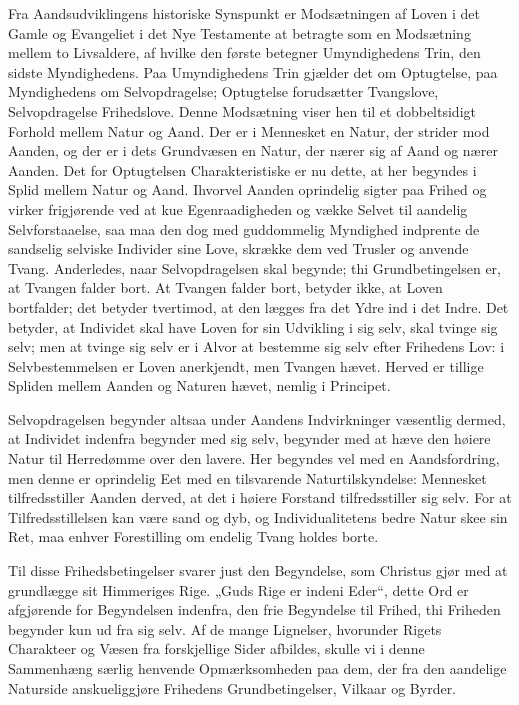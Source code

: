 \documentclass[12pt]{book}
\begin{document}
Fra Aandsudviklingens historiske Synspunkt er Modsætningen af Loven
i det Gamle og Evangeliet i det Nye Testamente at betragte som en
Modsætning mellem to Livsaldere, af hvilke den første betegner
Umyndighedens Trin, den sidste Myndighedens. Paa Umyndighedens
Trin gjælder det om Optugtelse, paa Myndighedens om Selvopdragelse;
Optugtelse forudsætter Tvangslove, Selvopdragelse Frihedslove. Denne
Modsætning viser hen til et dobbeltsidigt Forhold mellem Natur og
Aand. Der er i Mennesket en Natur, der strider mod Aanden, og der er
i dets Grundvæsen en Natur, der nærer sig af Aand og nærer Aanden.
Det for Optugtelsen Charakteristiske er nu dette, at her begyndes i
Splid mellem Natur og Aand. Ihvorvel Aanden oprindelig sigter paa
Frihed og virker frigjørende ved at kue Egenraadigheden og vække
Selvet til aandelig Selvforstaaelse, saa maa den dog med guddommelig
Myndighed indprente de sandselig selviske Individer sine Love,
skrække dem ved Trusler og anvende Tvang. Anderledes, naar
Selvopdragelsen skal begynde; thi Grundbetingelsen er, at Tvangen
falder bort. At Tvangen falder bort, betyder ikke, at Loven
bortfalder; det betyder tvertimod, at den lægges fra det Ydre ind i
det Indre. Det betyder, at Individet skal have Loven for sin
Udvikling i sig selv, skal tvinge sig selv; men at tvinge sig selv
er i Alvor at bestemme sig selv efter Frihedens Lov: i
Selvbestemmelsen er Loven anerkjendt, men Tvangen hævet. Herved er
tillige Spliden mellem Aanden og Naturen hævet, nemlig i Principet.

Selvopdragelsen begynder altsaa under Aandens Indvirkninger
væsentlig dermed, at Individet indenfra begynder med sig selv,
begynder med at hæve den høiere Natur til Herredømme over den
lavere. Her begyndes vel med en Aandsfordring, men denne er
oprindelig Eet med en tilsvarende Naturtilskyndelse: Mennesket
tilfredsstiller Aanden derved, at det i høiere Forstand
tilfredsstiller sig selv. For at Tilfredsstillelsen kan være sand og
dyb, og Individualitetens bedre Natur skee sin Ret, maa enhver
Forestilling om endelig Tvang holdes borte.

Til disse Frihedsbetingelser svarer just den Begyndelse,
som Christus gjør med at grundlægge sit Himmeriges Rige. „Guds Rige
er indeni Eder“, dette Ord er afgjørende for Begyndelsen indenfra,
den frie Begyndelse til Frihed, thi Friheden begynder kun ud fra sig
selv. Af de mange Lignelser, hvorunder Rigets Charakteer og Væsen
fra forskjellige Sider afbildes, skulle vi i denne Sammenhæng særlig
henvende Opmærksomheden paa dem, der fra den aandelige Naturside
anskueliggjøre Frihedens Grundbetingelser, Vilkaar og Byrder.
\end{document}
